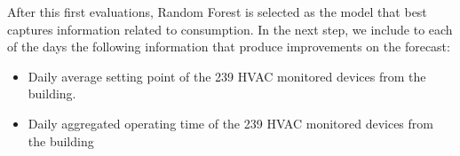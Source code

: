 \documentclass[10pt, conference, compsocconf]{IEEEtran}
\begin{document}
\begin{center}
\end{center}

After this first evaluations, Random Forest is selected as the model that best captures information related to consumption. In the next step, we include to each of the days the following information that produce improvements on the forecast:

\begin{itemize}
\item Daily average setting point of the 239 HVAC monitored devices from the building. 
\item Daily aggregated operating time of the 239 HVAC monitored devices from the building
\end{itemize}
\end{document}
